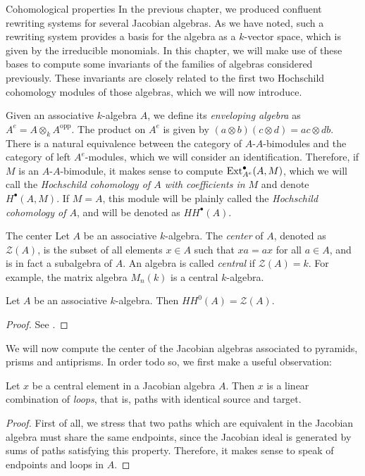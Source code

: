 \begin{chapter}{Cohomological properties}
In the previous chapter, we produced confluent rewriting systems for several Jacobian algebras. As we have noted, such a rewriting system provides a basis for the algebra as a $k$-vector space, which is given by the irreducible monomials. In this chapter, we will make use of these bases to compute some invariants of the families of algebras considered previously. These invariants are closely related to the first two Hochschild cohomology modules of those algebras, which we will now introduce.

Given an associative $k$-algebra $A$, we define its \emph{enveloping algebra} as $A^e=A\otimes_k A^{\mathrm{opp}}$. The product on $A^e$ is given by $(a\otimes b)(c\otimes d)=ac\otimes db$.
There is a natural equivalence between the category of $A$-$A$-bimodules and the category of left $A^e$-modules, which we will consider an identification. Therefore, if $M$ is an $A$-$A$-bimodule, it makes sense to compute $\operatorname{Ext}^\bullet_{A^e}(A,M)$, which we will call the \emph{Hochschild cohomology of $A$ with coefficients in $M$} and denote $H^\bullet(A,M)$.
If $M=A$, this module will be plainly called the \emph{Hochschild cohomology of $A$}, and will be denoted as $HH^\bullet(A)$.

\begin{section}{The center}
Let $A$ be an associative $k$-algebra. The \emph{center} of $A$, denoted as $\mathcal{Z}(A)$, is the subset of all elements $x\in A$ such that $xa=ax$ for all $a\in A$, and is in fact a subalgebra of $A$. An algebra is called \emph{central} if $\mathcal{Z}(A)=k$. For example, the matrix algebra $M_n(k)$ is a central $k$-algebra.

\begin{lemma} Let $A$ be an associative $k$-algebra. Then $HH^0(A) = \mathcal{Z}(A)$.
\end{lemma}
\begin{proof} See \cite{Red01}.
\end{proof}

We will now compute the center of the Jacobian algebras associated to pyramids, prisms and antiprisms. In order todo so, we first make a useful observation:

\begin{obs} Let $x$ be a central element in a Jacobian algebra $A$. Then $x$ is a linear combination of \emph{loops}, that is, paths with identical source and target.
\end{obs}
\begin{proof} First of all, we stress that two paths which are equivalent in the Jacobian algebra must share the same endpoints, since the Jacobian ideal is generated by sums of paths satisfying this property. Therefore, it makes sense to speak of endpoints and loops in $A$.


\end{proof}
\end{section}
\end{chapter}
